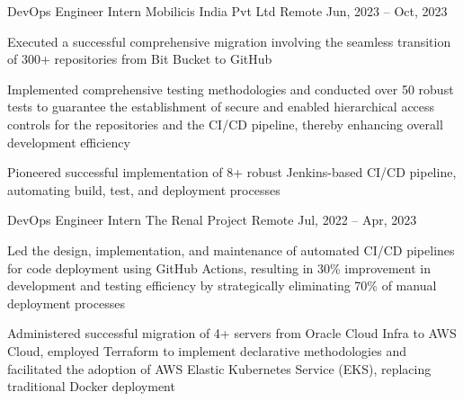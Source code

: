\documentclass[]{awesome-cv}
\begin{document}
\begin{cventries}
{\begin{cvitems}
        \end{cvitems}}
    \cventry
    {DevOps Engineer Intern}
    {Mobilicis India Pvt Ltd}
    {Remote}
    {Jun, 2023 – Oct, 2023}
    {\begin{cvitems}
            \item {Executed a successful comprehensive migration involving the seamless transition of 300+ repositories from Bit Bucket to GitHub}
            \item {Implemented comprehensive testing methodologies and conducted over 50 robust tests to guarantee the establishment of secure and enabled hierarchical access controls for the repositories and the CI/CD pipeline, thereby enhancing overall development efficiency}
            \item {Pioneered successful implementation of 8+ robust Jenkins-based CI/CD pipeline, automating build, test, and deployment processes}
        \end{cvitems}}
    \cventry
    {DevOps Engineer Intern}
    {The Renal Project}
    {Remote}
    {Jul, 2022 – Apr, 2023}
    {\begin{cvitems}
            \item {Led the design, implementation, and maintenance of automated CI/CD pipelines for code deployment using GitHub Actions, resulting in 30\% improvement in development and testing efficiency by strategically eliminating 70\% of manual deployment processes}
            \item {Administered successful migration of 4+ servers from Oracle Cloud Infra to AWS Cloud, employed Terraform to implement declarative methodologies and facilitated the adoption of AWS Elastic Kubernetes Service (EKS), replacing traditional Docker deployment}
        \end{cvitems}}
\end{cventries}
\vspace{-6mm}
\end{document}
